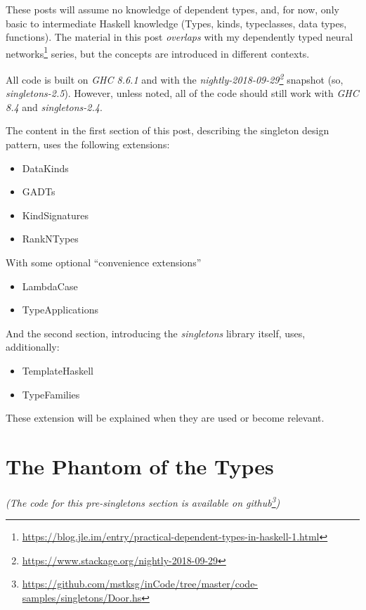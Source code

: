 \documentclass[]{article}
\renewcommand{\href}[2]{#2\footnote{\url{#1}}}
\begin{document}
These posts will assume no knowledge of dependent types, and, for now, only
basic to intermediate Haskell knowledge (Types, kinds, typeclasses, data types,
functions). The material in this post \emph{overlaps} with my
\href{https://blog.jle.im/entry/practical-dependent-types-in-haskell-1.html}{dependently
typed neural networks} series, but the concepts are introduced in different
contexts.

All code is built on \emph{GHC 8.6.1} and with the
\emph{\href{https://www.stackage.org/nightly-2018-09-29}{nightly-2018-09-29}}
snapshot (so, \emph{singletons-2.5}). However, unless noted, all of the code
should still work with \emph{GHC 8.4} and \emph{singletons-2.4}.

The content in the first section of this post, describing the singleton design
pattern, uses the following extensions:

\begin{itemize}
\tightlist
\item
  DataKinds
\item
  GADTs
\item
  KindSignatures
\item
  RankNTypes
\end{itemize}

With some optional ``convenience extensions''

\begin{itemize}
\tightlist
\item
  LambdaCase
\item
  TypeApplications
\end{itemize}

And the second section, introducing the \emph{singletons} library itself, uses,
additionally:

\begin{itemize}
\tightlist
\item
  TemplateHaskell
\item
  TypeFamilies
\end{itemize}

These extension will be explained when they are used or become relevant.

\section{The Phantom of the Types}\label{the-phantom-of-the-types}

\emph{(The code for this pre-singletons section is available
\href{https://github.com/mstksg/inCode/tree/master/code-samples/singletons/Door.hs}{on
github})}
\end{document}
